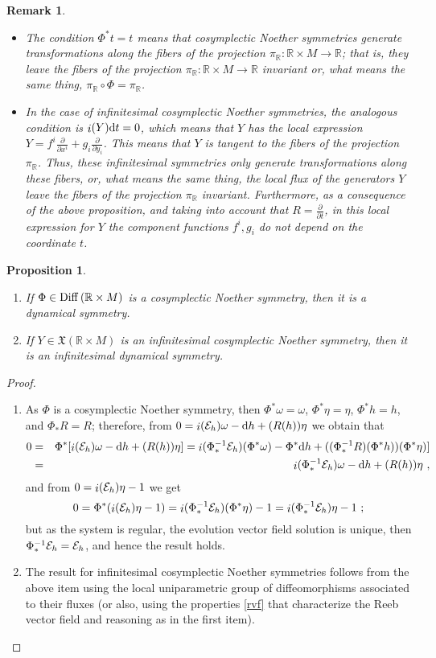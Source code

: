 \documentclass[12pt]{report}
\newtheorem{prop}[teor]{Proposition}
\newtheorem{remark}[teor]{Remark}
\def\beann{\begin{eqnarray*}}
\def\eeann{\end{eqnarray*}}
\def\ben{\begin{enumerate}}
\def\een{\end{enumerate}}
\def\derpar#1#2{\frac{\partial{#1}}{\partial{#2}}}
\def\qed{\ifvmode\removelastskip\fi
{\unskip\nobreak\hfil\penalty50\hbox{}\nobreak\hfil
\hbox{\vrule height1.2ex width1.2ex}\parfillskip=0pt
\finalhyphendemerits=0 \par\smallskip}}
\def\vf{\mathfrak X}
\def\d{{\rm d}}
\def\Real{\mathbb{R}}
\def\inn{\mathop{i}\nolimits}
\begin{document}
\begin{remark}{\rm 
\begin{itemize}
 \item
The condition $\Phi^*t=t$ means that
cosymplectic Noether symmetries generate transformations along
the fibers of the projection
 $\pi_\Real\colon \Real\times M\longrightarrow\Real$; that
is, they leave the fibers of the projection
 $\pi_\Real\colon \Real\times M\longrightarrow\Real$ invariant or,
 what means the same thing,
$\pi_\Real\circ \Phi=\pi_\Real$.
\item
In the case of infinitesimal cosymplectic Noether symmetries, the
analogous condition is $\inn(Y)\d t=0$, which means that $Y$ has
the local expression
$\displaystyle Y=f^i\frac{\partial}{\partial x^i}+g_i\frac{\partial}{\partial y_i}$.
This means that $Y$ is tangent to the fibers of the projection
 $\pi_\Real$. Thus, these infinitesimal symmetries only generate 
transformations along these fibers, or, what means the same thing, 
the local flux of the generators $Y$ leave the fibers of the projection
 $\pi_\Real$ invariant.
 Furthermore, as a consequence of the above proposition,
 and taking into account that $\displaystyle R=\derpar{}{t}$,
in this local expression for $Y$
the component functions $f^i,g_i$ do not depend on the coordinate $t$.
\end{itemize}
}\end{remark}

\begin{prop}
\ben
\item
If $\Phi\in{\rm Diff}\, (\Real\times M)$ is a cosymplectic Noether symmetry, then it is a
dynamical symmetry.
\item
If $Y\in\vf(\Real\times M)$ is an infinitesimal cosymplectic Noether symmetry, then it is
an infinitesimal dynamical symmetry.
\een
\label{simdin2}
\end{prop}
\begin{proof}
\ben
\item
As $\Phi$ is a  cosymplectic Noether symmetry, then
$\Phi^*\omega=\omega$, $\Phi^*\eta=\eta$, $\Phi^*h=h$,
and $\Phi_*R=R$; therefore, from 
$0=\inn({\cal E}_h)\omega-\d h+(R(h))\eta$ we obtain that
\beann
0&=&\Phi^*[\inn({\cal E}_h)\omega-\d h+(R(h))\eta]=
\inn(\Phi_*^{-1}{\cal E}_h)(\Phi^*\omega)-\Phi^*\d h
+((\Phi_*^{-1}R)(\Phi^*h))(\Phi^*\eta)]
\\ &=&
\inn(\Phi_*^{-1}{\cal E}_h)\omega-\d h+(R(h))\eta \ ,
\eeann
and from $0=\inn({\cal E}_h)\eta-1$ we get
$$
0=\Phi^*(\inn({\cal E}_h)\eta-1)=\inn(\Phi_*^{-1}{\cal E}_h)(\Phi^*\eta)-1=
\inn(\Phi_*^{-1}{\cal E}_h)\eta-1 \ ;
$$
but as the system is regular, the evolution vector field solution is unique,
then $\Phi_*^{-1}{\cal E}_h={\cal E}_h$, and hence the result holds.
\item
The result for infinitesimal cosymplectic Noether symmetries follows
from the above item using the local uniparametric group of diffeomorphisms
associated to their fluxes
(or also, using the properties \eqref{rvf} that characterize the
Reeb vector field and reasoning as in the first item).
\een
\qed \end{proof}
\end{document}

